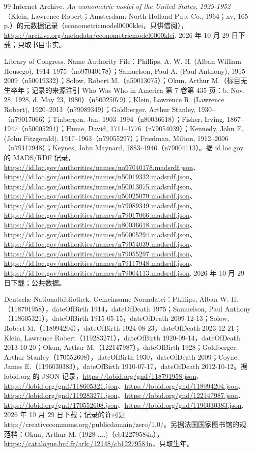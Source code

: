 \begin{thebibliography}{99}
 Internet Archive. \emph{An econometric model of the United States, 1929-1952}（Klein, Lawrence Robert；Amsterdam: North Holland Pub. Co., 1964；xv, 165 p.）的元数据记录（econometricmodel0000klei，只供借阅），\url{https://archive.org/metadata/econometricmodel0000klei}. 2026 年 10 月 29 日下载；只取书目事实。

 Library of Congress. Name Authority File：Phillips, A. W. H. (Alban William Housego), 1914--1975（no97040178）；Samuelson, Paul A. (Paul Anthony), 1915--2009（n50019332）；Solow, Robert M.（n50013075）；Okun, Arthur M.（标目无生卒年；记录的来源注引 Who Was Who in America 第 7 卷第 435 页：b. Nov. 28, 1928, d. May 23, 1980）（n50025079）；Klein, Lawrence R. (Lawrence Robert), 1920--2013（n79089349）；Goldberger, Arthur Stanley, 1930--（n79017066）；Tinbergen, Jan, 1903--1994（n80036618）；Fisher, Irving, 1867--1947（n50005294）；Hume, David, 1711--1776（n79054039）；Kennedy, John F. (John Fitzgerald), 1917--1963（n79055297）；Friedman, Milton, 1912--2006（n79117948）；Keynes, John Maynard, 1883--1946（n79004113）。据 id.loc.gov 的 MADS/RDF 记录，\url{https://id.loc.gov/authorities/names/no97040178.madsrdf.json}、\url{https://id.loc.gov/authorities/names/n50019332.madsrdf.json}、\url{https://id.loc.gov/authorities/names/n50013075.madsrdf.json}、\url{https://id.loc.gov/authorities/names/n50025079.madsrdf.json}、\url{https://id.loc.gov/authorities/names/n79089349.madsrdf.json}、\url{https://id.loc.gov/authorities/names/n79017066.madsrdf.json}、\url{https://id.loc.gov/authorities/names/n80036618.madsrdf.json}、\url{https://id.loc.gov/authorities/names/n50005294.madsrdf.json}、\url{https://id.loc.gov/authorities/names/n79054039.madsrdf.json}、\url{https://id.loc.gov/authorities/names/n79055297.madsrdf.json}、\url{https://id.loc.gov/authorities/names/n79117948.madsrdf.json}、\url{https://id.loc.gov/authorities/names/n79004113.madsrdf.json}. 2026 年 10 月 29 日下载；公共数据。

 Deutsche Nationalbibliothek. Gemeinsame Normdatei：Phillips, Alban W. H.（118791958），dateOfBirth 1914，dateOfDeath 1975；Samuelson, Paul Anthony（118605321），dateOfBirth 1915-05-15，dateOfDeath 2009-12-13；Solow, Robert M.（118994204），dateOfBirth 1924-08-23，dateOfDeath 2023-12-21；Klein, Lawrence Robert（119283271），dateOfBirth 1920-09-14，dateOfDeath 2013-10-20；Okun, Arthur M.（122147987），dateOfBirth 1928；Goldberger, Arthur Stanley（170552608），dateOfBirth 1930，dateOfDeath 2009；Coyne, James E.（1196030383），dateOfBirth 1910-07-17，dateOfDeath 2012-10-12。据 lobid.org 的 JSON 记录，\url{https://lobid.org/gnd/118791958.json}、\url{https://lobid.org/gnd/118605321.json}、\url{https://lobid.org/gnd/118994204.json}、\url{https://lobid.org/gnd/119283271.json}、\url{https://lobid.org/gnd/122147987.json}、\url{https://lobid.org/gnd/170552608.json}、\url{https://lobid.org/gnd/1196030383.json}. 2026 年 10 月 29 日下载；记录的许可是 http://creativecommons.org/publicdomain/zero/1.0/。另据法国国家图书馆的规范档：Okun, Arthur M. (1928-....)（cb12279584n），\url{https://catalogue.bnf.fr/ark:/12148/cb12279584n}，只取生年。


\end{thebibliography}
